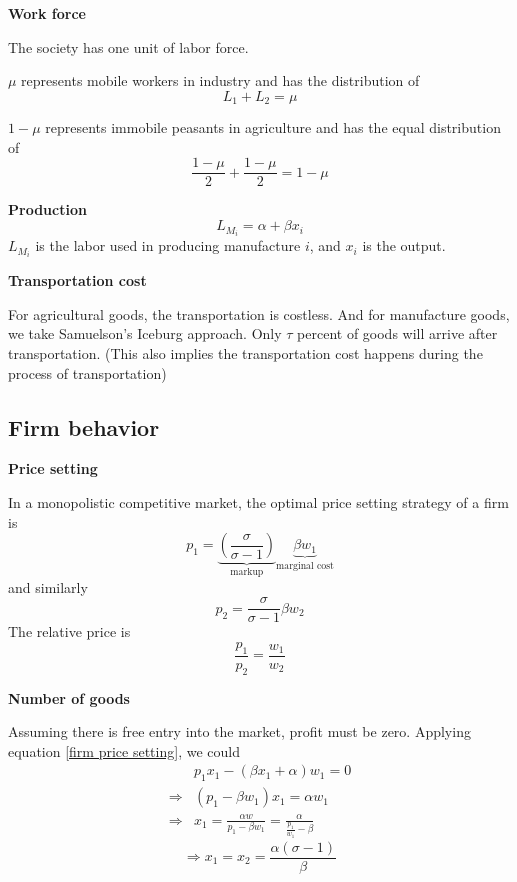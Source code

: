 \documentclass{article}
\numberwithin{equation}{section} %
\begin{document}
\textbf{Work force}

The society has one unit of labor force.

$\mu$ represents mobile workers in industry and has the distribution of 
\begin{equation}
  L_1+L_2=\mu \label{worker distribution}
\end{equation}

$1-\mu$ represents immobile peasants in agriculture and has the equal distribution of 
\begin{equation}
  \frac{1-\mu}{2}+\frac{1-\mu}{2}=1-\mu \label{peasant distribution}
\end{equation}

\textbf{Production}
\begin{equation}
  L_{M_i}=\alpha+\beta x_i
\end{equation}
$L_{M_i}$ is the labor used in producing manufacture $i$, and $x_i$ is the output.

\textbf{Transportation cost}

For agricultural goods, the transportation is costless. And for manufacture goods, we take Samuelson's Iceburg approach. Only $\tau$ percent of goods will arrive after transportation. (This also implies the transportation cost happens during the process of transportation)


\subsection{Firm behavior} %
\label{sub:firm_behavior}
\textbf{Price setting}

In a monopolistic competitive market, the optimal price setting strategy of a firm is 
\begin{equation}
  p_1 = \underbrace{(\frac{\sigma}{\sigma-1})}_{\text{markup}}\underbrace{\beta w_1}_{\text{marginal cost}}
  \label{firm price setting}
\end{equation}
and similarly 
\begin{equation}
  p_2=\frac{\sigma}{\sigma-1}\beta w_2
\end{equation}
The relative price is 
\begin{equation}
  \frac{p_1}{p_2}=\frac{w_1}{w_2}
\end{equation}

\textbf{Number of goods}

Assuming there is free entry into the market, profit must be zero. Applying equation \ref{firm price setting}, we could
$$
\begin{aligned}  
&p_1 x_1 - (\beta x_1 +\alpha)w_1=0
\\\Rightarrow & (p_1-\beta w_1)x_1=\alpha w_1
\\\Rightarrow & x_1=\frac{\alpha w}{p_1-\beta w_1}=\frac{\alpha}{\frac{p_1}{w_1}-\beta}
\end{aligned}$$
\begin{equation}
  \Rightarrow x_1=x_2=\frac{\alpha(\sigma-1)}{\beta} \label{output behavior}
\end{equation}
\end{document}
